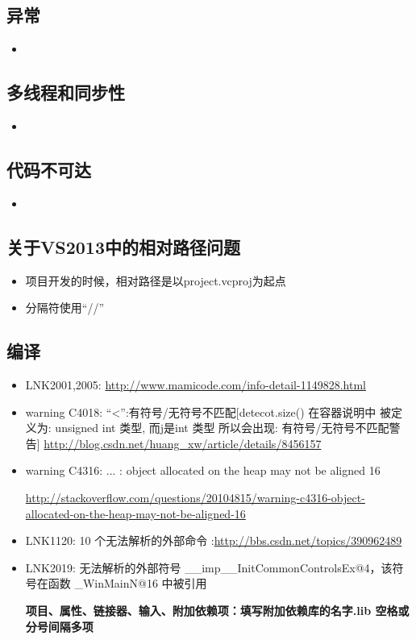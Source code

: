 \documentclass[UTF8,a4paper,12pt]{ctexbook} %
\begin{document}
		\subsection{异常}
			\begin{itemize}
				\item 
			\end{itemize}
		\subsection{多线程和同步性}
			\begin{itemize}
				\item 
			\end{itemize}
		\subsection{代码不可达}
			\begin{itemize}
				\item 
			\end{itemize}
		\subsection{关于VS2013中的相对路径问题}
			\begin{itemize}
				\item  项目开发的时候，相对路径是以project.vcproj为起点
				\item  分隔符使用“//”
			\end{itemize}	
		\subsection{编译}
			\begin{itemize}
				\item  LNK2001,2005: \url{http://www.mamicode.com/info-detail-1149828.html}
				\item  warning C4018: “<”:有符号/无符号不匹配[detecot.size() 在容器说明中 被定义为: unsigned int 类型, 而j是int 类型 所以会出现: 有符号/无符号不匹配警告] \url{http://blog.csdn.net/huang\_xw/article/details/8456157}
				
				\item  warning C4316: ... : object allocated on the heap may not be aligned 16
				
				\url{http://stackoverflow.com/questions/20104815/warning-c4316-object-allocated-on-the-heap-may-not-be-aligned-16}
				
				\item LNK1120: 10 个无法解析的外部命令 :\url{http://bbs.csdn.net/topics/390962489}
				
				\item LNK2019: 无法解析的外部符号 \_\_imp\_\_InitCommonControlsEx@4，该符号在函数 \_WinMainN@16 中被引用 
				
				\textbf{项目、属性、链接器、输入、附加依赖项：填写附加依赖库的名字.lib 空格或分号间隔多项}
			\end{itemize}
\end{document}
